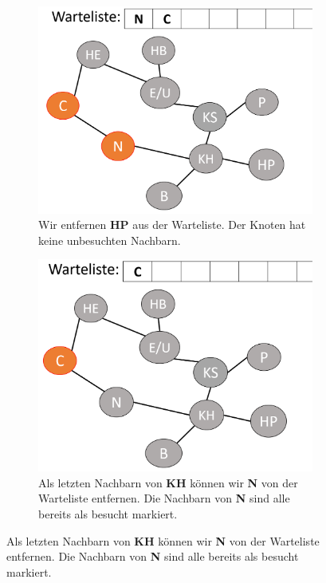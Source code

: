\begin{figure}[H]\ContinuedFloat
    \begin{subfigure}[h]{0.45\textwidth}
    \centering
    \includegraphics[width=\textwidth]{Pictures/BS/BFSB8.PNG}
    \caption{Wir entfernen {\bf{HP}} aus der Warteliste. Der Knoten hat keine unbesuchten Nachbarn.}
    \end{subfigure}
    \qquad
    \begin{subfigure}[h]{0.45\textwidth}
    \centering
    \includegraphics[width=\textwidth]{Pictures/BS/BFSB9.PNG}
    \caption{Als letzten Nachbarn von {\bf{KH}} können wir {\bf{N}} von der Warteliste entfernen. Die Nachbarn von {\bf{N}} sind alle bereits als besucht markiert. }
    \end{subfigure}
\end{figure}
